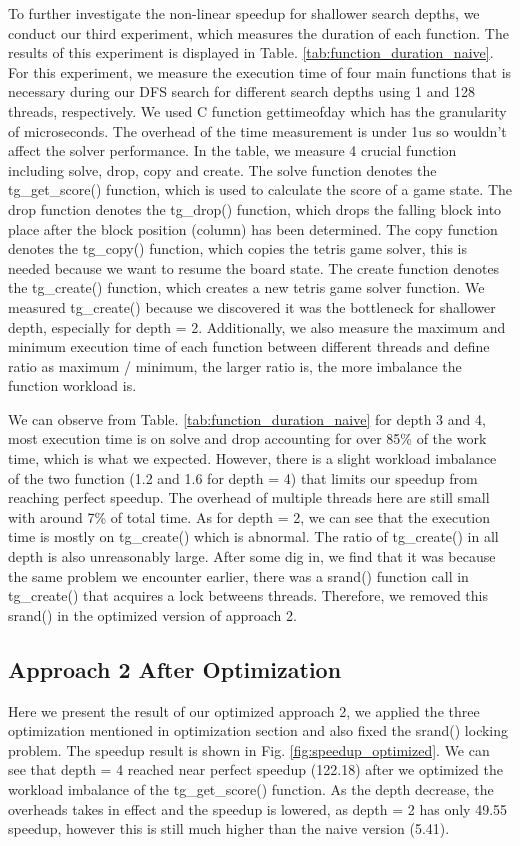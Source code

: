 To further investigate the non-linear speedup for shallower search depths, we conduct our third experiment, which measures the duration of each function. The results of this experiment is displayed in Table. \ref{tab:function_duration_naive}. For this experiment, we measure the execution time of four main functions that is necessary during our DFS search for different search depths using 1 and 128 threads, respectively. We used C function gettimeofday which has the granularity of microseconds. The overhead of the time measurement is under 1us so wouldn't affect the solver performance. 
In the table, we measure 4 crucial function including solve, drop, copy and create. The solve function denotes the tg\_get\_score() function, which is used to calculate the score of a game state. The drop function denotes the tg\_drop() function, which drops the falling block into place after the block position (column) has been determined. The copy function denotes the tg\_copy() function, which copies the tetris game solver, this is needed because we want to resume the board state. The create function denotes the tg\_create() function, which creates a new tetris game solver function. We measured tg\_create() because we discovered it was the bottleneck for shallower depth, especially for depth = 2. 
Additionally, we also measure the maximum and minimum execution time of each function between different threads and define ratio as maximum / minimum, the larger ratio is, the more imbalance the function workload is.  

We can observe from Table. \ref{tab:function_duration_naive} for depth 3 and 4, most execution time is on solve and drop accounting for over 85\% of the work time, which is what we expected. However, there is a slight workload imbalance of the two function (1.2 and 1.6 for depth = 4) that limits our speedup from reaching perfect speedup. The overhead of multiple threads here are still small with around 7\% of total time. As for depth = 2, we can see that the execution time is mostly on tg\_create() which is abnormal. The ratio of tg\_create() in all depth is also unreasonably large. After some dig in, we find that it was because the same problem we encounter earlier, there was a srand() function call in tg\_create() that acquires a lock betweens threads. Therefore, we removed this srand() in the optimized version of approach 2. 

\subsection{Approach 2 After Optimization}
Here we present the result of our optimized approach 2, we applied the three optimization mentioned in optimization section and also fixed the srand() locking problem. The speedup result is shown in Fig. \ref{fig:speedup_optimized}. We can see that depth = 4 reached near perfect speedup (122.18) after we optimized the workload imbalance of the tg\_get\_score() function. As the depth decrease, the overheads takes in effect and the speedup is lowered, as depth = 2 has only 49.55 speedup, however this is still much higher than the naive version (5.41). 


